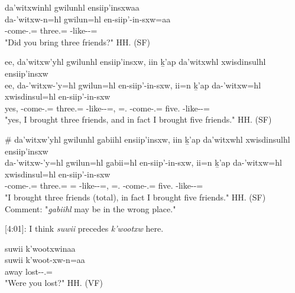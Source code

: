 \begin{exe}
    \ex \begin{xlist}
        \item  \glll da'witxwinhl gwilunhl ensiip'insxwaa\\
            da-'witxw-n=hl gwilun=hl en-siip'-in-sxw=aa\\
            \Com{}-come-\Ssg{}.\Ii{}=\Cn{} three.\Hum{}=\Cn{} \Nmlz{}-like--\Antip{}=\Q{} \\
            \glt "Did you bring three friends?" \hfill HH.\ElicitationDate{} (SF)
        \item \glll ee, da'witxw'yhl gwilunhl ensiip'insxw, iin ḵ'ap da'witxwhl xwisdinsulhl ensiip'insxw \\
            ee, da-'witxw-'y=hl gwilun=hl en-siip'-in-sxw, ii=n ḵ'ap da-'witxw=hl xwisdinsul=hl en-siip'-in-sxw \\
            yes, \Com{}-come-\Fsg{}.\Ii{}=\Cn{} three.\Hum{}=\Cn{} \Nmlz{}-like--\Antip{}=\Q{}, \Ccnj{}=\Fsg{}.\I{} \Verum{} \Com{}-come-\Fsg{}.\Ii{}=\Cn{} five.\Hum{} \Nmlz{}-like--\Antip{}=\Q{} \\
            \glt "yes, I brought three friends, and in fact I brought five friends." \hfill HH.\ElicitationDate{} (SF)
        \item \glll \# da'witxw'yhl gwilunhl g̱abiihl ensiip'insxw, iin ḵ'ap da'witxwhl xwisdinsulhl ensiip'insxw \\
            {} da-'witxw-'y=hl gwilun=hl g̱abii=hl en-siip'-in-sxw, ii=n ḵ'ap da-'witxw=hl xwisdinsul=hl en-siip'-in-sxw \\
            {} \Com{}-come-\Fsg{}.\Ii{}=\Cn{} three.\Hum{}=\Cn{} \Cnt{}=\Cn{} \Nmlz{}-like--\Antip{}=\Q{}, \Ccnj{}=\Fsg{}.\I{} \Verum{} \Com{}-come-\Fsg{}.\Ii{}=\Cn{} five.\Hum{} \Nmlz{}-like--\Antip{}=\Q{}\\
            \glt "I brought three friends (total), in fact I brought five friends." \hfill HH.\ElicitationDate{} (SF) \\
            Comment: "\textit{g̱abiihl} may be in the wrong place."
    \end{xlist}
\end{exe}

[4:01]: I think \textit{suwii} precedes \textit{k'wootxw} here.

\begin{exe}
    \ex \glll suwii k'wootxwinaa \\
    suwii k'woot-xw-n=aa \\
    away lost-\Val{}-\Ssg{}.\Ii{}=\Q{} \\
    \glt "Were you lost?" \hfill HH.\ElicitationDate{} (VF)
\end{exe}

